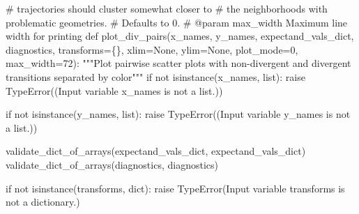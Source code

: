 \documentclass[
  letterpaper,
  DIV=11,
  numbers=noendperiod]{scrartcl}
\newenvironment{Shaded}{\begin{snugshade}}{\end{snugshade}}
\newcommand{\BuiltInTok}[1]{\textcolor[rgb]{0.00,0.23,0.31}{#1}}
\newcommand{\CommentTok}[1]{\textcolor[rgb]{0.37,0.37,0.37}{#1}}
\newcommand{\ControlFlowTok}[1]{\textcolor[rgb]{0.00,0.23,0.31}{#1}}
\newcommand{\DecValTok}[1]{\textcolor[rgb]{0.68,0.00,0.00}{#1}}
\newcommand{\KeywordTok}[1]{\textcolor[rgb]{0.00,0.23,0.31}{#1}}
\newcommand{\NormalTok}[1]{\textcolor[rgb]{0.00,0.23,0.31}{#1}}
\newcommand{\OperatorTok}[1]{\textcolor[rgb]{0.37,0.37,0.37}{#1}}
\newcommand{\PreprocessorTok}[1]{\textcolor[rgb]{0.68,0.00,0.00}{#1}}
\newcommand{\StringTok}[1]{\textcolor[rgb]{0.13,0.47,0.30}{#1}}
\newcommand{\VariableTok}[1]{\textcolor[rgb]{0.07,0.07,0.07}{#1}}
\begin{document}
\begin{Shaded}
\begin{Highlighting}[]
\CommentTok{\#                        trajectories should cluster somewhat closer to}
\CommentTok{\#                        the neighborhoods with problematic geometries.}
\CommentTok{\#                   Defaults to 0.}
\CommentTok{\# @param max\_width Maximum line width for printing}
\KeywordTok{def}\NormalTok{ plot\_div\_pairs(x\_names, y\_names, expectand\_vals\_dict,}
\NormalTok{                   diagnostics, transforms}\OperatorTok{=}\NormalTok{\{\},}
\NormalTok{                   xlim}\OperatorTok{=}\VariableTok{None}\NormalTok{, ylim}\OperatorTok{=}\VariableTok{None}\NormalTok{,}
\NormalTok{                   plot\_mode}\OperatorTok{=}\DecValTok{0}\NormalTok{, max\_width}\OperatorTok{=}\DecValTok{72}\NormalTok{):}
  \CommentTok{"""Plot pairwise scatter plots with non{-}divergent and divergent}
\CommentTok{     transitions separated by color"""}
  \ControlFlowTok{if} \KeywordTok{not} \BuiltInTok{isinstance}\NormalTok{(x\_names, }\BuiltInTok{list}\NormalTok{):}
    \ControlFlowTok{raise} \PreprocessorTok{TypeError}\NormalTok{((}\StringTok{\textquotesingle{}Input variable \textasciigrave{}x\_names\textasciigrave{} is not a list.\textquotesingle{}}\NormalTok{))}

  \ControlFlowTok{if} \KeywordTok{not} \BuiltInTok{isinstance}\NormalTok{(y\_names, }\BuiltInTok{list}\NormalTok{):}
    \ControlFlowTok{raise} \PreprocessorTok{TypeError}\NormalTok{((}\StringTok{\textquotesingle{}Input variable \textasciigrave{}y\_names\textasciigrave{} is not a list.\textquotesingle{}}\NormalTok{))}

\NormalTok{  validate\_dict\_of\_arrays(expectand\_vals\_dict, }\StringTok{\textquotesingle{}expectand\_vals\_dict\textquotesingle{}}\NormalTok{)}
\NormalTok{  validate\_dict\_of\_arrays(diagnostics, }\StringTok{\textquotesingle{}diagnostics\textquotesingle{}}\NormalTok{)}

  \ControlFlowTok{if} \KeywordTok{not} \BuiltInTok{isinstance}\NormalTok{(transforms, }\BuiltInTok{dict}\NormalTok{):}
    \ControlFlowTok{raise} \PreprocessorTok{TypeError}\NormalTok{(}\StringTok{\textquotesingle{}Input variable \textasciigrave{}transforms\textasciigrave{} is not a dictionary.\textquotesingle{}}\NormalTok{)}


\end{Highlighting}
\end{Shaded}
\end{document}
